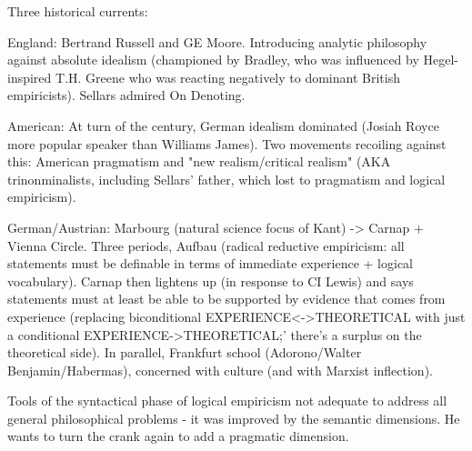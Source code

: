 \documentclass[12pt,a4paper]{report}
\begin{document}
Three historical currents:

England: Bertrand Russell and GE Moore. Introducing analytic philosophy against absolute idealism (championed by Bradley, who was influenced by Hegel-inspired T.H. Greene who was reacting negatively to dominant British empiricists). Sellars admired On Denoting.

American: At turn of the century, German idealism dominated (Josiah Royce more popular speaker than Williams James). Two movements recoiling against this: American pragmatism and "new realism/critical realism" (AKA trinonminalists, including Sellars' father, which lost to pragmatism and logical empiricism).

German/Austrian: Marbourg (natural science focus of Kant) -> Carnap + Vienna Circle. Three periods, Aufbau (radical reductive empiricism: all statements must be definable in terms of immediate experience + logical vocabulary). Carnap then lightens up (in response to CI Lewis) and says statements must at least be able to be supported by evidence that comes from experience (replacing biconditional EXPERIENCE<->THEORETICAL with just a conditional EXPERIENCE->THEORETICAL;' there's a surplus on the theoretical side).
In parallel, Frankfurt school (Adorono/Walter Benjamin/Habermas), concerned with culture (and with Marxist inflection).

Tools of the syntactical phase of logical empiricism not adequate to address all general philosophical problems - it was improved by the semantic dimensions. He wants to turn the crank again to add a pragmatic dimension.
\end{document}
